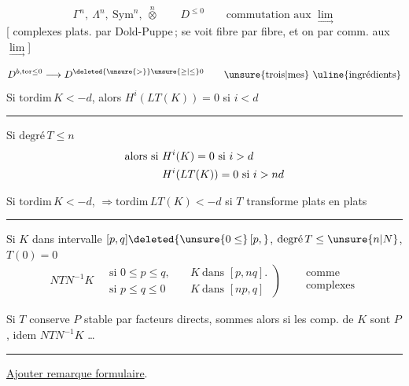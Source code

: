 \[
\Gamma^{n},\ \Lambda^{n},\ \mathrm{Sym}^{n},\ \overset{n}{\otimes}
\qquad D^{\leq 0}\qquad \text{commutation aux }\underset{\longrightarrow}{\lim}
\]
[  complexes plats.
 par Dold-Puppe\,; \unsure{\}|]} se voit fibre par fibre, et
on  par comm. aux $\underset{\longrightarrow}{\lim}$]

\[
D^{b,\mathrm{tor}\leq 0}\longrightarrow D^{\deleted{\unsure{>}}\unsure{\geq|\leq}0}
\qquad \text{\unsure{trois|mes} \uline{ingrédients}}
\]
Si $\mathrm{tordim}\,K<-d$, alors $H^i(LT(K))=0$ si $i<d$
\par\noindent\hfill\rule{.45\linewidth}{.2pt}

Si $\text{degré}\,T\leq n$
\[
\begin{aligned}
&\text{alors si }H^{i}(K)=0\ \text{si }i>d\\
&\hphantom{\text{alors si }}H^{i}(LT(K))=0\ \text{si }i>nd
\end{aligned}
\]

Si $\mathrm{tordim}\,K<-d$, $\Rightarrow\mathrm{tordim}\,LT(K)<-d$
si $T$ transforme plats en plats

\par\noindent\rule{.95\linewidth}{.2pt}

Si $K$ dans intervalle $[p,q]\deleted{\unsure{0\leq}\,[p,}$, $\text{degré}\,T\leq\unsure{n|N}$, $T(0)=0$
\[
\begin{aligned}
NTN^{-1}K\quad
\left.\begin{aligned}
\text{si }0\leq p\leq q,\quad &K\ \text{dans }[p,nq].\\
\text{si }p\leq q\leq 0\quad &K\ \text{dans }[np,q]
\end{aligned}\right)&\ \begin{aligned}&\text{comme}\\[-2pt]&\text{complexes}\end{aligned}
\end{aligned}
\]

Si $T$ conserve  $P$ stable par facteurs directs, sommes
alors si les comp. de $K$ sont $P$, idem $NTN^{-1}K$ \ldots

\par\noindent\rule{\linewidth}{.2pt}

\uline{Ajouter remarque formulaire}.

